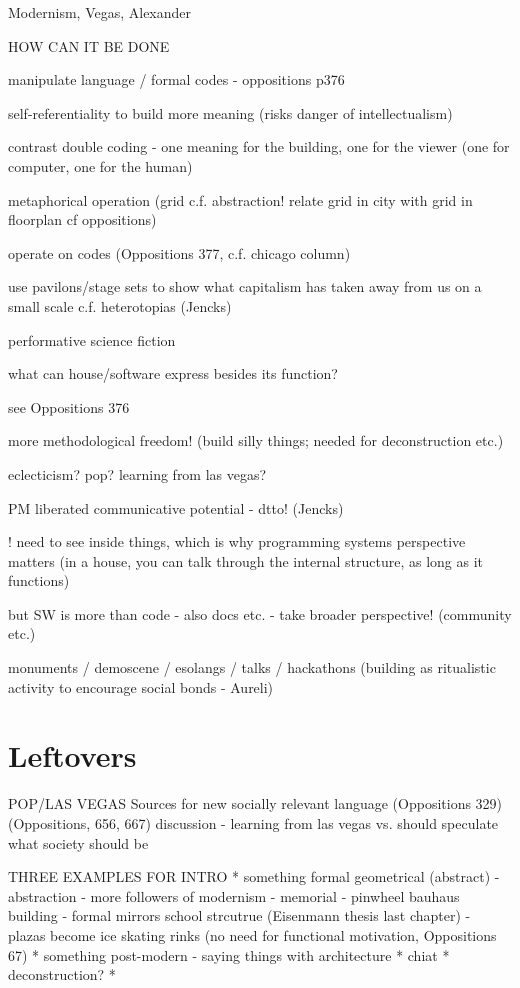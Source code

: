 Modernism, Vegas, Alexander


\newpage

HOW CAN IT BE DONE

manipulate language / formal codes - oppositions p376

self-referentiality to build more meaning
  (risks danger of intellectualism)

contrast double coding - one meaning for the building, one for the viewer
(one for computer, one for the human)

metaphorical operation (grid c.f. abstraction!
  relate grid in city with grid in floorplan cf oppositions)

operate on codes (Oppositions 377, c.f. chicago column)

use pavilons/stage sets to show what capitalism has
taken away from us on a small scale
c.f. heterotopias (Jencks)

performative science fiction

what can house/software express besides its function?

see Oppositions 376

more methodological freedom!
(build silly things; needed for deconstruction etc.)

eclecticism? pop? learning from las vegas?

PM liberated communicative potential - dtto! (Jencks)

! need to see inside things, which is why programming systems perspective matters
(in a house, you can talk through the internal structure, as long as it functions)

but SW is more than code - also docs etc. - take broader perspective!
(community etc.)

monuments / demoscene / esolangs / talks / hackathons
(building as ritualistic activity to encourage social bonds - Aureli)

\section{Leftovers}

POP/LAS VEGAS
Sources for new socially relevant language (Oppositions 329)
(Oppositions, 656,  667)
discussion - learning from las vegas
vs. should speculate what society should be


THREE EXAMPLES FOR INTRO
* something formal geometrical (abstract)
  - abstraction
  - more followers of modernism
  - memorial
  - pinwheel bauhaus building - formal mirrors school strcutrue (Eisenmann thesis last chapter)
  - plazas become ice skating rinks (no need for functional motivation, Oppositions 67)
* something post-modern - saying things with architecture
* chiat
* deconstruction?
*


